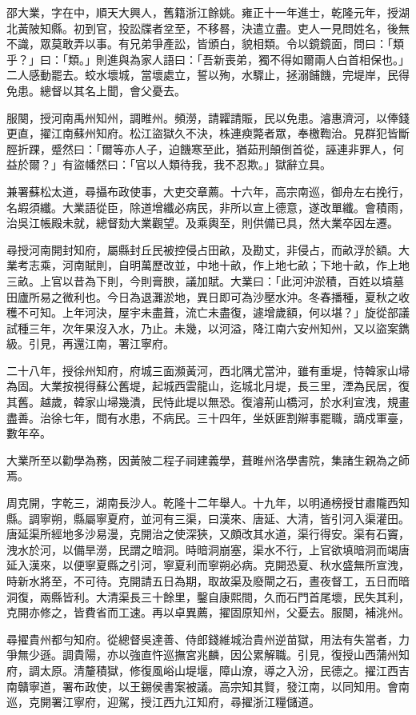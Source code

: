\begin{pinyinscope}
邵大業，字在中，順天大興人，舊籍浙江餘姚。雍正十一年進士，乾隆元年，授湖北黃陂知縣。初到官，投訟牒者坌至，不移晷，決遣立盡。吏人一見問姓名，後無不識，眾莫敢弄以事。有兄弟爭產訟，皆頒白，貌相類。令以鏡鏡面，問曰：「類乎？」曰：「類。」則進與為家人語曰：「吾新喪弟，獨不得如爾兩人白首相保也。」二人感動罷去。蛟水壞城，當壞處立，誓以殉，水驟止，拯溺餔饑，完堤岸，民得免患。總督以其名上聞，會父憂去。

服闋，授河南禹州知州，調睢州。頻澇，請糶請賑，民以免患。濬惠濟河，以俸錢更直，擢江南蘇州知府。松江盜獄久不決，株連瘐斃者眾，奉檄鞫治。見群犯皆斷脛折踝，蹙然曰：「爾等亦人子，迫饑寒至此，猶茹刑顛倒首從，誣連非罪人，何益於爾？」有盜幡然曰：「官以人類待我，我不忍欺。」獄辭立具。

兼署蘇松太道，尋攝布政使事，大吏交章薦。十六年，高宗南巡，御舟左右挽行，名嘏須纖。大業語從臣，除道增纖必病民，非所以宣上德意，遂改單纖。會積雨，治吳江帳殿未就，總督劾大業觀望。及乘輿至，則供備已具，然大業卒因左遷。

尋授河南開封知府，屬縣封丘民被控侵占田畝，及勘丈，非侵占，而畝浮於額。大業考志乘，河南賦則，自明萬歷改並，中地十畝，作上地七畝；下地十畝，作上地三畝。上官以昔為下則，今則膏腴，議加賦。大業曰：「此河沖淤積，百姓以墳墓田廬所易之微利也。今日為退灘淤地，異日即可為沙壓水沖。冬春播種，夏秋之收穫不可知。上年河決，屋宇未盡葺，流亡未盡復，遽增歲額，何以堪？」旋從部議試種三年，次年果沒入水，乃止。未幾，以河溢，降江南六安州知州，又以盜案鐫級。引見，再還江南，署江寧府。

二十八年，授徐州知府，府城三面瀕黃河，西北隅尤當沖，雖有重堤，恃韓家山埽為固。大業按視得蘇公舊堤，起城西雲龍山，迄城北月堤，長三里，湮為民居，復其舊。越歲，韓家山埽幾潰，民恃此堤以無恐。復濬荊山橋河，於水利宣洩，規畫盡善。治徐七年，間有水患，不病民。三十四年，坐妖匪割辮事罷職，謫戍軍臺，數年卒。

大業所至以勸學為務，因黃陂二程子祠建義學，葺睢州洛學書院，集諸生親為之師焉。

周克開，字乾三，湖南長沙人。乾隆十二年舉人。十九年，以明通榜授甘肅隴西知縣。調寧朔，縣屬寧夏府，並河有三渠，曰漢來、唐延、大清，皆引河入渠灌田。唐延渠所經地多沙易漫，克開治之使深狹，又頗改其水道，渠行得安。渠有石竇，洩水於河，以備旱澇，民謂之暗洞。時暗洞崩塞，渠水不行，上官欲填暗洞而竭唐延入漢來，以便寧夏縣之引河，寧夏利而寧朔必病。克開恐夏、秋水盛無所宣洩，時新水將至，不可待。克開請五日為期，取故渠及廢閘之石，晝夜督工，五日而暗洞復，兩縣皆利。大清渠長三十餘里，鑿自康熙間，久而石門首尾壞，民失其利，克開亦修之，皆費省而工速。再以卓異薦，擢固原知州，父憂去。服闋，補洮州。

尋擢貴州都勻知府。從總督吳達善、侍郎錢維城治貴州逆苗獄，用法有失當者，力爭無少遜。調貴陽，亦以強直忤巡撫宮兆麟，因公累解職。引見，復授山西蒲州知府，調太原。清釐積獄，修復風峪山堤堰，障山潦，導之入汾，民德之。擢江西吉南贛寧道，署布政使，以王錫侯書案被議。高宗知其賢，發江南，以同知用。會南巡，克開署江寧府，迎駕，授江西九江知府，尋擢浙江糧儲道。


\end{pinyinscope}
